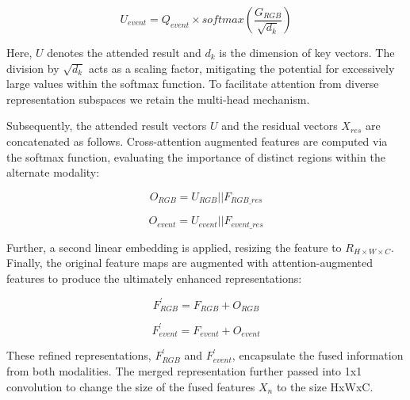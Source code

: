 \documentclass[lettersize,journal]{IEEEtran}
\begin{document}
\begin{equation}
    U_{event} = Q_{event} \times softmax\left(\frac{G_{RGB}}{\sqrt{d_k}}\right)
\end{equation}

Here, $U$ denotes the attended result and $d_k$ is the dimension of key vectors. The division by $\sqrt{d_k}$ acts as a scaling factor, mitigating the potential for excessively large values within the softmax function. To facilitate attention from diverse representation subspaces we retain the multi-head mechanism.



Subsequently, the attended result vectors $U$ and the residual vectors $X_{res}$ are concatenated as follows. Cross-attention augmented features are computed via the softmax function, evaluating the importance of distinct regions within the alternate modality:



\begin{equation}
    O_{RGB} = U_{RGB} \vert\vert F_{RGB\_res} 
\end{equation}

\begin{equation}
    O_{event} = U_{event} \vert\vert F_{event\_res}
\end{equation}





Further, a second linear embedding is applied, resizing the feature to $R_{H \times W \times C}$. Finally, the original feature maps are augmented with attention-augmented features to produce the ultimately enhanced representations:

\begin{equation}
    F_{RGB}^{'} = F_{RGB} + O_{RGB}
\end{equation}

\begin{equation}
   F_{event}^{'} = F_{event} + O_{event}
\end{equation}



These refined representations, $F_{RGB}^{'}$ and $F_{event}^{'}$, encapsulate the fused information from both modalities. The merged representation further passed into 1x1 convolution to change the size of the fused features $X_{n}$ to the size HxWxC.
\end{document}
